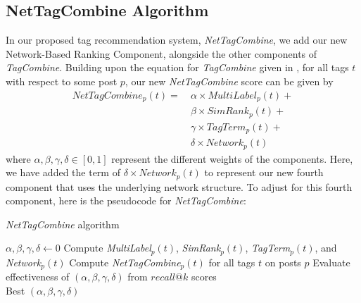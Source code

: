 \documentclass[10pt]{IEEEtran}
\begin{document}
\subsection{NetTagCombine Algorithm}

In our proposed tag recommendation system, \textit{NetTagCombine}, we add our new Network-Based Ranking Component, alongside the other components of \textit{TagCombine}. Building upon the equation for \textit{TagCombine} given in \cite{1}, for all tags $t$ with respect to some post $p$, our new \textit{NetTagCombine} score can be given by
\begin{align*}
NetTagCombine_p(t) =\ &\alpha \times MultiLabel_p(t) +\\
&\beta \times SimRank_p(t) +\\
&\gamma \times TagTerm_p(t) +\\
&\delta \times Network_p(t)
\end{align*}
where $\alpha,\beta,\gamma,\delta \in [0,1]$ represent the different weights of the components. Here, we have added the term of $\delta \times Network_p(t)$ to represent our new fourth component that uses the underlying network structure. To adjust for this fourth component, here is the pseudocode for \textit{NetTagCombine}:


\begin{algorithm*}
  \caption{\textit{NetTagCombine} algorithm}\label{ntc}
  \begin{algorithmic}[1]
    \State $\alpha, \beta, \gamma, \delta \gets 0$
        \State Compute \textit{MultiLabel}$_p(t)$, \textit{SimRank}$_p(t)$, \textit{TagTerm}$_p(t)$, and \textit{Network$_p(t)$}
      \EndFor
    \EndFor
            \State Compute \textit{NetTagCombine}$_p(t)$ for all tags $t$ on posts $p$
            \State Evaluate effectiveness of $(\alpha,\beta,\gamma,\delta)$ from $recall@k$ scores
          \EndFor
        \EndFor
      \EndFor
    \EndFor\\
    \Return Best $(\alpha,\beta,\gamma,\delta)$\;
  \end{algorithmic}
\end{algorithm*}
\end{document}
